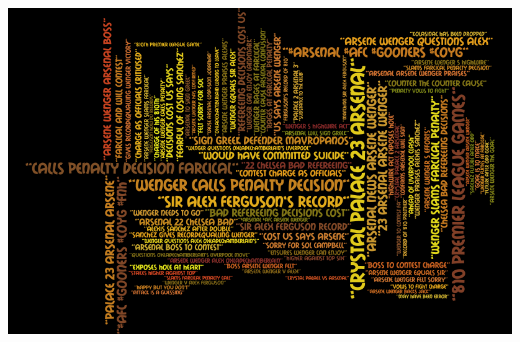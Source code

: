 \documentclass[14pt, openany]{article}
\begin{document}
\begin{center}
\includegraphics[scale=0.6]{Images/wenger_quadrigram.png}
\end{center}
\paragraph{}
\end{document}
